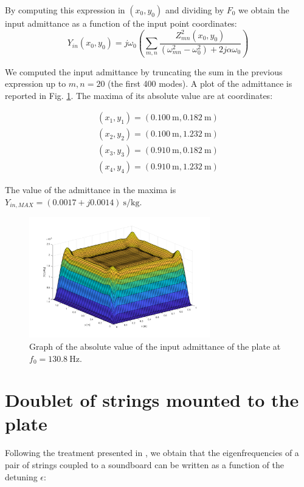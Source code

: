 \documentclass[a4paper]{article}
\begin{document}
By computing this expression in $(x_0, y_0)$ and dividing by $F_0$ we obtain the input admittance as a function of the input point coordinates:
$$ Y_{in}(x_0, y_0) =  j\omega_0 \left( \sum_{m,n} \frac{Z_{mn}^2(x_0, y_0)}{(\omega_{mn}^2 - \omega_0^2) + 2j\alpha \omega_0} \right)$$

We computed the input admittance by truncating the sum in the previous expression up to $m, n = 20$ (the first 400 modes). A plot of the admittance is reported in Fig. \ref{fig:adm}. The maxima of its absolute value are at coordinates:

\begin{align*}
	(x_1, y_1) = (\SI{0.100}{\metre}, \SI{0.182}{\meter}) \\
	(x_2, y_2) = (\SI{0.100}{\metre}, \SI{1.232}{\meter}) \\
	(x_3, y_3) = (\SI{0.910}{\metre}, \SI{0.182}{\meter}) \\
	(x_4, y_4) = (\SI{0.910}{\metre}, \SI{1.232}{\meter})
\end{align*}

The value of the admittance in the maxima is $Y_{in, MAX} = (0.0017 + j0.0014)~\si{\second\per\kilogram}$.

\begin{figure}[h]
	\centering
	\includegraphics[width=0.7\textwidth]{admittance.png}
	\caption{Graph of the absolute value of the input admittance of the plate at $f_0 = \SI{130.8}{\hertz}$.}
	\label{fig:adm}
\end{figure}

\section{Doublet of strings mounted to the plate}

Following the treatment presented in \cite{chker}, we obtain that the eigenfrequencies of a pair of strings coupled to a soundboard can be written as a function of the detuning $\epsilon$:
\end{document}
